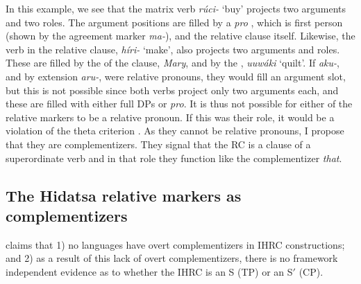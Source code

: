 \documentclass[output=paper]{LSP/langsci}
\begin{document}
In this example, we see that the matrix verb \textit{r\'uci-} `buy' projects two arguments and two  roles. The argument positions are filled by a \textit{pro} , which is first person (shown by the agreement marker \textit{ma-}), and the relative clause itself. Likewise, the verb in the relative clause, \textit{h\'iri-} `make', also projects two arguments and  roles. These are filled by the  of the clause, \textit{Mary}, and by the , \textit{uuwáki} `quilt'. If \textit{aku-}, and by extension \textit{aru-}, were relative pronouns, they would fill an argument slot, but this is not possible since both verbs project only two arguments each, and these are filled with either full DPs or \textit{pro}. It is thus not possible for either of the  relative markers to be a relative pronoun. If this was their role, it would be a violation of the theta criterion \citep[36]{Chomsky1981}. As they cannot be relative pronouns, I propose that they are complementizers. They signal that the RC is a  clause of a superordinate verb and in that role they function like the  complementizer \textit{that}. 

\subsection{The {Hidatsa} relative markers as complementizers}\label{sec:boyle:5.2}

\citet{Culy1990} claims that 1) no languages have overt complementizers in IHRC constructions; and 2) as a result of this lack of overt complementizers, there is no framework independent evidence as to whether the IHRC is an S (TP) or an S$'$ (CP).  
\end{document}
